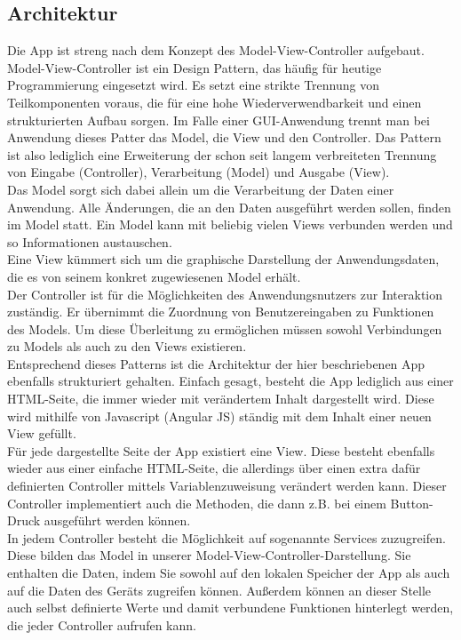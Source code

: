 \subsection{Architektur}
Die App ist streng nach dem Konzept des Model-View-Controller aufgebaut.
\\
Model-View-Controller ist ein Design Pattern, das häufig für heutige Programmierung eingesetzt wird. Es setzt eine strikte Trennung von Teilkomponenten voraus, die für eine hohe Wiederverwendbarkeit und einen strukturierten Aufbau sorgen. Im Falle einer GUI-Anwendung trennt man bei Anwendung dieses Patter das Model, die View und den Controller. Das Pattern ist also lediglich eine Erweiterung der schon seit langem verbreiteten Trennung von Eingabe (Controller), Verarbeitung (Model) und Ausgabe (View). 
\\
Das Model sorgt sich dabei allein um die Verarbeitung der Daten einer Anwendung. Alle Änderungen, die an den Daten ausgeführt werden sollen, finden im Model statt. Ein Model kann mit beliebig vielen Views verbunden werden und so Informationen austauschen. 
\\
Eine View kümmert sich um die graphische Darstellung der Anwendungsdaten, die es von seinem konkret zugewiesenen Model erhält. 
\\
Der Controller ist für die Möglichkeiten des Anwendungsnutzers zur Interaktion zuständig. Er übernimmt die Zuordnung von Benutzereingaben zu Funktionen des Models. Um diese Überleitung zu ermöglichen müssen sowohl Verbindungen zu Models als auch zu den Views existieren.
\\
Entsprechend dieses Patterns ist die Architektur der hier beschriebenen App ebenfalls strukturiert gehalten. Einfach gesagt, besteht die App lediglich aus einer HTML-Seite, die immer wieder mit verändertem Inhalt dargestellt wird. Diese wird mithilfe von Javascript (Angular JS) ständig mit dem Inhalt einer neuen View gefüllt.
\\
Für jede dargestellte Seite der App existiert eine View. Diese besteht ebenfalls wieder aus einer einfache HTML-Seite, die allerdings über einen extra dafür definierten Controller mittels Variablenzuweisung verändert werden kann. Dieser Controller implementiert auch die Methoden, die dann z.B. bei einem Button-Druck ausgeführt werden können.
\\
In jedem Controller besteht die Möglichkeit auf sogenannte Services zuzugreifen. Diese bilden das Model in unserer Model-View-Controller-Darstellung. Sie enthalten die Daten, indem Sie sowohl auf den lokalen Speicher der App als auch auf die Daten des Geräts zugreifen können. Außerdem können an dieser Stelle auch selbst definierte Werte und damit verbundene Funktionen hinterlegt werden, die jeder Controller aufrufen kann.
